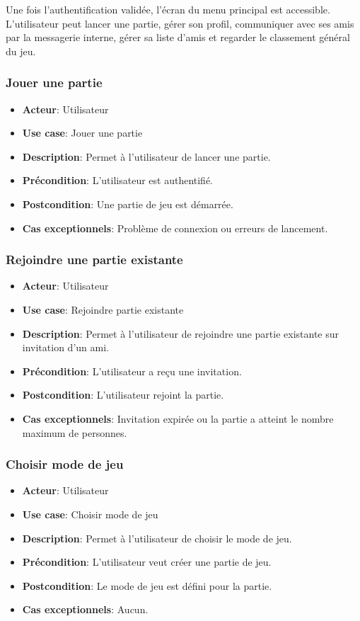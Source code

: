 \documentclass{article}
\begin{document}
Une fois l'authentification validée, l'écran du menu principal est accessible. L'utilisateur peut lancer une partie, gérer son profil, communiquer avec ses amis par la messagerie interne, gérer sa liste d'amis et regarder le classement général du jeu.

\subsubsection*{Jouer une partie}
\begin{itemize}
    \item \textbf{Acteur}: Utilisateur
    \item \textbf{Use case}: Jouer une partie
    \item \textbf{Description}: Permet à l'utilisateur de lancer une partie.
    \item \textbf{Précondition}: L'utilisateur est authentifié.
    \item \textbf{Postcondition}: Une partie de jeu est démarrée.
    \item \textbf{Cas exceptionnels}: Problème de connexion ou erreurs de lancement.
\end{itemize}

\subsubsection*{Rejoindre une partie existante}
\begin{itemize}
    \item \textbf{Acteur}: Utilisateur
    \item \textbf{Use case}: Rejoindre partie existante
    \item \textbf{Description}: Permet à l'utilisateur de rejoindre une partie existante sur invitation d'un ami.
    \item \textbf{Précondition}: L'utilisateur a reçu une invitation.
    \item \textbf{Postcondition}: L'utilisateur rejoint la partie.
    \item \textbf{Cas exceptionnels}: Invitation expirée ou la partie a atteint le nombre maximum de personnes.
\end{itemize}

\subsubsection*{Choisir mode de jeu}
\begin{itemize}
    \item \textbf{Acteur}: Utilisateur
    \item \textbf{Use case}: Choisir mode de jeu
    \item \textbf{Description}: Permet à l'utilisateur de choisir le mode de jeu.
    \item \textbf{Précondition}: L'utilisateur veut créer une partie de jeu.
    \item \textbf{Postcondition}: Le mode de jeu est défini pour la partie.
    \item \textbf{Cas exceptionnels}: Aucun.
\end{itemize}
\end{document}
